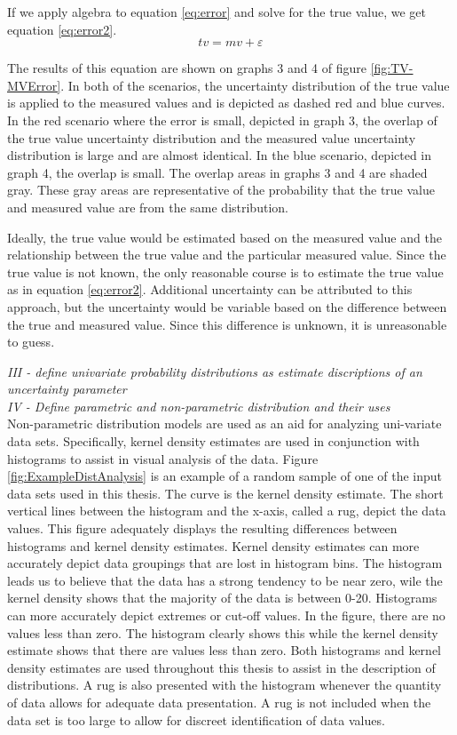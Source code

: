 \begin{linenumbers}
If we apply algebra to equation \ref{eq:error} and solve for the true value, we get equation \ref{eq:error2}.
\begin{equation}
\label{eq:error2}
tv=mv+\varepsilon
\end{equation}

The results of this equation are shown on graphs 3 and 4 of figure \ref{fig:TV-MVError}.  In both of the scenarios, the uncertainty distribution of the true value is applied to the measured values and is depicted as dashed red and blue curves.  In the red scenario where the error is small, depicted in graph 3, the overlap of the true value uncertainty distribution and the measured value uncertainty distribution is large and are almost identical.  In the blue scenario, depicted in graph 4, the overlap is small.  The overlap areas in graphs 3 and 4 are shaded gray.  These gray areas are representative of the probability that the true value and measured value are from the same distribution.

Ideally, the true value would be estimated based on the measured value and the relationship between the true value and the particular measured value.  Since the true value is not known, the only reasonable course is to estimate the true value as in equation \ref{eq:error2}.  Additional uncertainty can be attributed to this approach, but the uncertainty would be variable based on the difference between the true and measured value.  Since this difference is unknown, it is unreasonable to guess.

\emph{III - define univariate probability distributions as estimate discriptions of an uncertainty parameter}\\

\emph{IV - Define parametric and non-parametric distribution and their uses}\\
Non-parametric distribution models are used as an aid for analyzing uni-variate data sets.  Specifically, kernel density estimates are used in conjunction with histograms to assist in visual analysis of the data.  Figure \ref{fig:ExampleDistAnalysis} is an example of a random sample of one of the input data sets used in this thesis.  The curve is the kernel density estimate.  The short vertical lines between the histogram and the x-axis, called a rug, depict the data values.  This figure adequately displays the resulting differences between histograms and kernel density estimates.  Kernel density estimates can more accurately depict data groupings that are lost in histogram bins.  The histogram leads us to believe that the data has a strong tendency to be near zero, wile the kernel density shows that the majority of the data is between 0-20.  Histograms can more accurately depict extremes or cut-off values.  In the figure, there are no values less than zero.  The histogram clearly shows this while the kernel density estimate shows that there are values less than zero.  Both histograms and kernel density estimates are used throughout this thesis to assist in the description of distributions.  A rug is also presented with the histogram whenever the quantity of data allows for adequate data presentation.  A rug is not included when the data set is too large to allow for discreet identification of data values.


\end{linenumbers}
